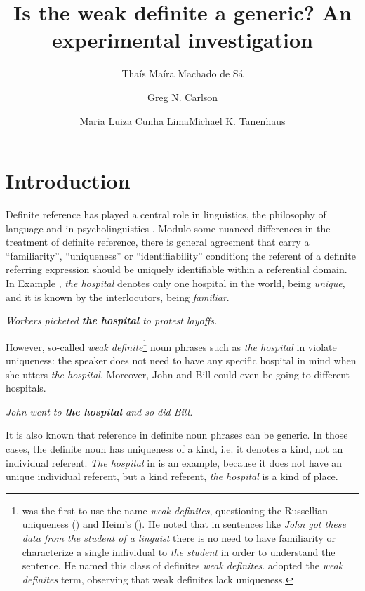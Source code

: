 \documentclass[output=paper,
modfonts
]{langscibook}
\title{Is the weak definite a generic? An experimental investigation}
\author{Thaís Maíra Machado {de Sá}\affiliation{Universidade Federal de Minas Gerais}\and Greg N. Carlson\affiliation{University of Rochester}\and Maria Luiza {Cunha Lima}\affiliation{Universidade Federal de Minas Gerais}\lastand Michael K. Tanenhaus\affiliation{University of Rochester \\ Nanjing Normal University}}
\begin{document}
\maketitle

\section{Introduction}\label{sec:desaetal:1}
Definite reference has played a central role in linguistics, the philosophy of language and in psycholinguistics \citep{Russell1905, Strawson1950,Donnellan1966,ClarkMarshall1981,Heim1982,Aguilar-GuevaraZwarts2013}. Modulo some nuanced differences in the treatment of definite reference, there is general agreement that  carry a “familiarity”, “uniqueness” or “identifiability” condition; the referent of a definite referring expression should be uniquely identifiable within a referential domain. In Example , \textit{the hospital} denotes only one hospital in the world, being \textit{unique}, and it is known by the interlocutors, being \textit{familiar}.

\ea \label{ex:desaetal:1} 
\textit{Workers picketed \textbf{the hospital} to protest layoffs.}
\z

However, so-called \textit{weak definite}\footnote{\citet{Poesio1994} was the first to use the name \textit{weak definites}, questioning the Russellian uniqueness (\citeyear{Russell1905}) and Heim’s  (\citeyear{Heim1982}). He noted that in sentences like \textit{John got these data from the student of a linguist} there is no need to have familiarity or characterize a single individual to \textit{the student} in order  to understand the sentence. He named this class of definites \textit{weak definites}. \citet{CarlsonSussman2005} adopted the \textit{weak definites} term, observing that weak definites lack uniqueness.} noun phrases \citep{CarlsonSussman2005} such as \textit{the hospital} in  violate uniqueness: the speaker does not need to have any specific hospital in mind when she utters \textit{the hospital}. Moreover, John and Bill could even be going to different hospitals.

\ea \label{ex:desaetal:2}
\textit{John went to \textbf{the hospital} and so did Bill.}
\z

It is also known that reference in definite noun phrases can be generic. In those cases, the definite noun has uniqueness of a kind, i.e. it denotes a kind, not an individual referent. \textit{The hospital} in  is an example, because it does not have an unique individual referent, but a kind referent, \textit{the hospital} is a kind of place. 
\end{document}
